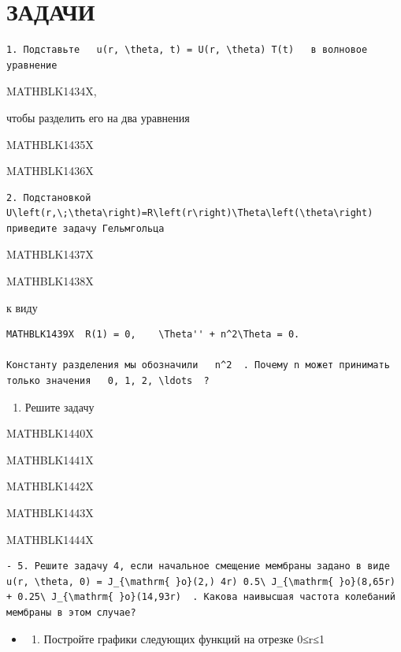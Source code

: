 \documentclass[
]{article}
\providecommand{\tightlist}{%
  \setlength{\itemsep}{0pt}\setlength{\parskip}{0pt}}
\begin{document}
{{{\section{ЗАДАЧИ}\label{ux437ux430ux434ux430ux447ux438-11}

\begin{verbatim}
1. Подставьте   u(r, \theta, t) = U(r, \theta) T(t)   в волновое уравнение
\end{verbatim}

MATHBLK1434X,

чтобы разделить его на два уравнения

MATHBLK1435X

MATHBLK1436X

\begin{verbatim}
2. Подстановкой   U\left(r,\;\theta\right)=R\left(r\right)\Theta\left(\theta\right)   приведите задачу Гельмгольца
\end{verbatim}

MATHBLK1437X

MATHBLK1438X

к виду

\begin{verbatim}
MATHBLK1439X  R(1) = 0,    \Theta'' + n^2\Theta = 0.

Константу разделения мы обозначили   n^2  . Почему n может принимать только значения   0, 1, 2, \ldots  ?
\end{verbatim}

\begin{enumerate}
\def\labelenumi{\arabic{enumi}.}
\setcounter{enumi}{2}
\tightlist
\item
  Решите задачу
\end{enumerate}

MATHBLK1440X

MATHBLK1441X

MATHBLK1442X

MATHBLK1443X

MATHBLK1444X

\begin{verbatim}
- 5. Решите задачу 4, если начальное смещение мембраны задано в виде   u(r, \theta, 0) = J_{\mathrm{ }o}(2,) 4r) 0.5\ J_{\mathrm{ }o}(8,65r) + 0.25\ J_{\mathrm{ }o}(14,93r)  . Какова наивысшая частота колебаний мембраны в этом случае?
\end{verbatim}

\begin{itemize}
\item
  \begin{enumerate}
  \def\labelenumi{\arabic{enumi}.}
  \setcounter{enumi}{5}
  \tightlist
  \item
    Постройте графики следующих функций на отрезке 0≤r≤1
  \end{enumerate}


\end{itemize}}}}
\end{document}
